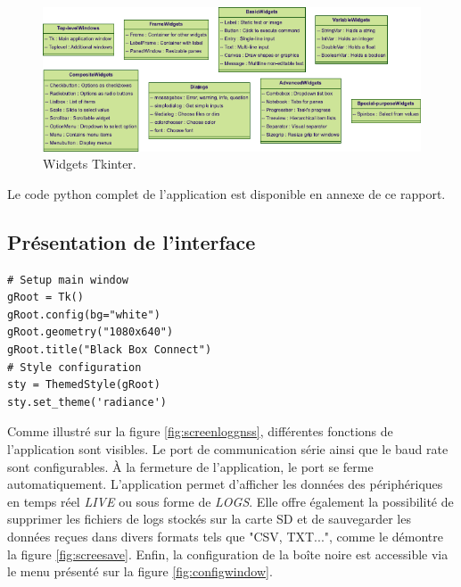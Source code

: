 \begin{figure}[h]
	\centering
	\includegraphics[width=.9\linewidth]{../figures/application/tkinter}
	\caption{Widgets Tkinter.}
	\label{fig:tkinter}
\end{figure}

Le code python complet de l'application est disponible en annexe de ce rapport.

\subsection{Présentation de l'interface}

\begin{code}
\caption{Extrait de code, création de la forme.}
\label{code:pythonExample}
\vspace*{-1mm}
\begin{verbatim}
# Setup main window
gRoot = Tk()
gRoot.config(bg="white")
gRoot.geometry("1080x640")
gRoot.title("Black Box Connect")
# Style configuration
sty = ThemedStyle(gRoot)
sty.set_theme('radiance') 
\end{verbatim}
\end{code}

\clearpage

Comme illustré sur la figure \ref{fig:screenloggnss}, différentes fonctions de l'application sont visibles. Le port de communication série ainsi que le baud rate sont configurables. À la fermeture de l'application, le port se ferme automatiquement. L'application permet d'afficher les données des périphériques en temps réel \textit{LIVE} ou sous forme de \textit{LOGS}. Elle offre également la possibilité de supprimer les fichiers de logs stockés sur la carte SD et de sauvegarder les données reçues dans divers formats tels que "CSV, TXT...", comme le démontre la figure \ref{fig:screesave}. Enfin, la configuration de la boîte noire est accessible via le menu présenté sur la figure \ref{fig:configwindow}.

